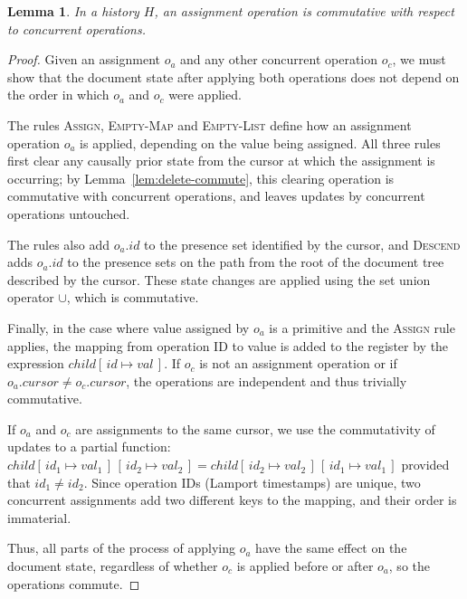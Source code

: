\documentclass[10pt,journal,compsoc]{IEEEtran}
\newtheorem{lemma}[theorem]{Lemma}
\begin{document}
\begin{lemma}\label{lem:assign-commute}
In a history $H$, an assignment operation is commutative with respect to concurrent operations.
\end{lemma}

\begin{proof}
Given an assignment $o_a$ and any other concurrent operation $o_c$, we must show that the document state after applying both operations does not depend on the order in which $o_a$ and $o_c$ were applied.

The rules \textsc{Assign}, \textsc{Empty-Map} and \textsc{Empty-List} define how an assignment operation $o_a$ is applied, depending on the value being assigned. All three rules first clear any causally prior state from the cursor at which the assignment is occurring; by Lemma~\ref{lem:delete-commute}, this clearing operation is commutative with concurrent operations, and leaves updates by concurrent operations untouched.

The rules also add $o_a.\mathit{id}$ to the presence set identified by the cursor, and \textsc{Descend} adds $o_a.\mathit{id}$ to the presence sets on the path from the root of the document tree described by the cursor. These state changes are applied using the set union operator $\cup$, which is commutative.

Finally, in the case where value assigned by $o_a$ is a primitive and the \textsc{Assign} rule applies, the mapping from operation ID to value is added to the register by the expression $\mathit{child}[\,\mathit{id} \mapsto \mathit{val}\,]$. If $o_c$ is not an assignment operation or if $o_a.\mathit{cursor} \not= o_c.\mathit{cursor}$, the operations are independent and thus trivially commutative.

If $o_a$ and $o_c$ are assignments to the same cursor, we use the commutativity of updates to a partial function: $\mathit{child}[\,\mathit{id}_1 \mapsto \mathit{val}_1\,]\,[\,\mathit{id}_2 \mapsto \mathit{val}_2\,] = \mathit{child}[\,\mathit{id}_2 \mapsto \mathit{val}_2\,]\,[\,\mathit{id}_1 \mapsto \mathit{val}_1\,]$ provided that $\mathit{id}_1 \not= \mathit{id}_2$. Since operation IDs (Lamport timestamps) are unique, two concurrent assignments add two different keys to the mapping, and their order is immaterial.

Thus, all parts of the process of applying $o_a$ have the same effect on the document state, regardless of whether $o_c$ is applied before or after $o_a$, so the operations commute.
\end{proof}
\end{document}
